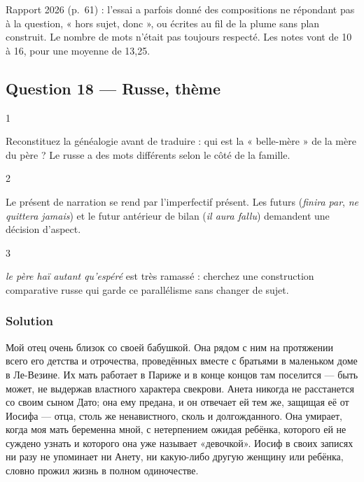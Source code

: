 \documentclass[11pt,a4paper]{article}
\begin{document}
\begin{jury}

Rapport 2026 (p.~61) : l'essai a parfois donné des compositions ne répondant pas à la question, « hors sujet, donc », ou écrites au fil de la plume sans plan construit. Le nombre de mots n'était pas toujours respecté. Les notes vont de 10 à 16, pour une moyenne de 13,25.

\end{jury}

\hypertarget{question-18-russe-thuxe8me}{%
\subsection{Question 18 --- Russe, thème}\label{question-18-russe-thuxe8me}}

\begin{indication}{1}

Reconstituez la généalogie avant de traduire : qui est la « belle-mère » de la mère du père ? Le russe a des mots différents selon le côté de la famille.

\end{indication}

\begin{indication}{2}

Le présent de narration se rend par l'imperfectif présent. Les futurs (\emph{finira par}, \emph{ne quittera jamais}) et le futur antérieur de bilan (\emph{il aura fallu}) demandent une décision d'aspect.

\end{indication}

\begin{indication}{3}

\emph{le père haï autant qu'espéré} est très ramassé : cherchez une construction comparative russe qui garde ce parallélisme sans changer de sujet.

\end{indication}

\hypertarget{solution-17}{%
\subsubsection{Solution}\label{solution-17}}

Мой отец очень близок со своей бабушкой. Она рядом с ним на протяжении всего его детства и отрочества, проведённых вместе с братьями в маленьком доме в Ле-Везине. Их мать работает в Париже и в конце концов там поселится --- быть может, не выдержав властного характера свекрови. Анета никогда не расстанется со своим сыном Дато; она ему предана, и он отвечает ей тем же, защищая её от Иосифа --- отца, столь же ненавистного, сколь и долгожданного. Она умирает, когда моя мать беременна мной, с нетерпением ожидая ребёнка, которого ей не суждено узнать и которого она уже называет «девочкой». Иосиф в своих записях ни разу не упоминает ни Анету, ни какую-либо другую женщину или ребёнка, словно прожил жизнь в полном одиночестве.
\end{document}
